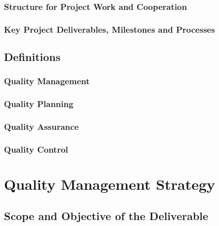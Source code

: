 \documentclass[
  11pt,
]{article}
\begin{document}
\hypertarget{structure-for-project-work-and-cooperation}{%
\subsubsection{Structure for Project Work and
Cooperation}\label{structure-for-project-work-and-cooperation}}

\hypertarget{key-project-deliverables-milestones-and-processes}{%
\subsubsection{Key Project Deliverables, Milestones and
Processes}\label{key-project-deliverables-milestones-and-processes}}

\hypertarget{definitions}{%
\subsection{Definitions}\label{definitions}}

\hypertarget{quality-management}{%
\subsubsection{Quality Management}\label{quality-management}}

\hypertarget{quality-planning}{%
\subsubsection{Quality Planning}\label{quality-planning}}

\hypertarget{quality-assurance}{%
\subsubsection{Quality Assurance}\label{quality-assurance}}

\hypertarget{quality-control}{%
\subsubsection{Quality Control}\label{quality-control}}

\clearpage

\hypertarget{quality-management-strategy}{%
\section{Quality Management
Strategy}\label{quality-management-strategy}}

\hypertarget{scope-and-objective-of-the-deliverable}{%
\subsection{Scope and Objective of the
Deliverable}\label{scope-and-objective-of-the-deliverable}}
\end{document}
